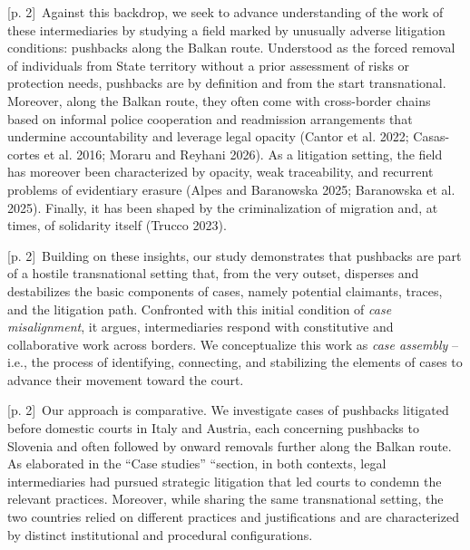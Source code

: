 \documentclass[10pt,a4paper]{article}
\begin{document}
{\scriptsize\color{gray} [p. 2]}\ Against this backdrop, we seek to advance understanding of the work of these intermediaries by studying a field marked by unusually adverse litigation conditions: pushbacks along the Balkan route. Understood as the forced removal of individuals from State territory without a prior assessment of risks or protection needs, pushbacks are by definition and from the start transnational. Moreover, along the Balkan route, they often come with cross-border chains based on informal police cooperation and readmission arrangements that undermine accountability and leverage legal opacity (Cantor et al. 2022; Casas-cortes et al. 2016; Moraru and Reyhani 2026). As a litigation setting, the field has moreover been characterized by opacity, weak traceability, and recurrent problems of evidentiary erasure (Alpes and Baranowska 2025; Baranowska et al. 2025). Finally, it has been shaped by the criminalization of migration and, at times, of solidarity itself (Trucco 2023).\par
{\scriptsize\color{gray} [p. 2]}\ Building on these insights, our study demonstrates that pushbacks are part of a hostile transnational setting that, from the very outset, disperses and destabilizes the basic components of cases, namely potential claimants, traces, and the litigation path. Confronted with this initial condition of \textit{case misalignment}, it argues, intermediaries respond with constitutive and collaborative work across borders. We conceptualize this work as \textit{case assembly} – i.e., the process of identifying, connecting, and stabilizing the elements of cases to advance their movement toward the court.\par
{\scriptsize\color{gray} [p. 2]}\ Our approach is comparative. We investigate cases of pushbacks litigated before domestic courts in Italy and Austria, each concerning pushbacks to Slovenia and often followed by onward removals further along the Balkan route. As elaborated in the “Case studies” “section, in both contexts, legal intermediaries had pursued strategic litigation that led courts to condemn the relevant practices. Moreover, while sharing the same transnational setting, the two countries relied on different practices and justifications and are characterized by distinct institutional and procedural configurations.\par
\end{document}
